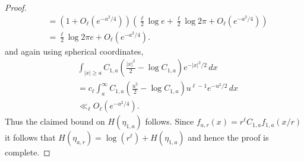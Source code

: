 \documentclass[10pt,a4paper]{amsart}
\begin{document}
\begin{proof}
\begin{align*}
    &= \left( 1 + O_{\ell}(e^{-a^2/4}) \right)\left(  \frac{\ell}{2}\log e + \frac{\ell}{2} \log 2\pi + O_{\ell}(e^{-a^2/4}) \right) \\
    &= \frac{\ell}{2} \log 2\pi e + O_{\ell}(e^{-a^2/4}).
    \end{align*} and again using spherical coordinates, 
    \begin{align*}
    &\int_{|x| \geq a} C_{1,a}\left(  \frac{|x|^2}{2} - \log C_{1,a} \right) e^{-|x|^2/2}  \, dx \\ &= c_{\ell}\int_{a}^{\infty} C_{1,a}\left(  \frac{u^2}{2} - \log C_{1,a} \right) u^{\ell - 1} e^{-u^2/2}  \, dx \\
    &\ll_{\ell} O_{\ell}(e^{-a^2/4}).
    \end{align*} Thus the claimed bound on $H(\eta_{1,a})$ follows. Since $f_{a,r}(x) = r^{\ell}C_{1,a}f_{1,a}(x/r)$ it follows that $H(\eta_{a,r}) = \log(r^{\ell}) + H(\eta_{1,a})$ and hence the proof is complete. 
\end{proof}
\end{document}
